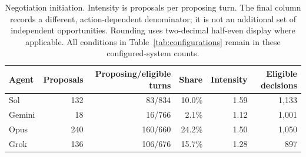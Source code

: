 \begin{table}[t]
\centering\small
\begin{tabular}{lrrrrr}\toprule
Agent & Proposals & Proposing/eligible turns & Share & Intensity & Eligible decisions\\\midrule
Sol & 132 & 83/834 & 10.0\% & 1.59 & 1,133 \\
Gemini & 18 & 16/766 & 2.1\% & 1.12 & 1,001 \\
Opus & 240 & 160/660 & 24.2\% & 1.50 & 1,050 \\
Grok & 136 & 106/676 & 15.7\% & 1.28 & 897 \\
\bottomrule\end{tabular}
\caption{Negotiation initiation. Intensity is proposals per proposing turn. The final column records a different, action-dependent denominator; it is not an additional set of independent opportunities. Rounding uses two-decimal half-even display where applicable. All conditions in Table~\ref{tab:configurations} remain in these configured-system counts.}
\label{tab:negotiation}
\end{table}
